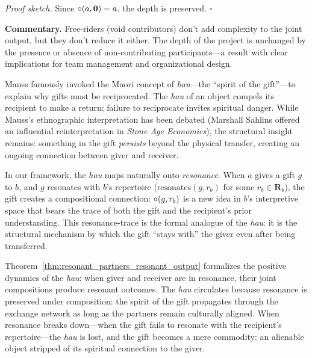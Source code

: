 \noindent\textit{Proof sketch.}\quad
Since $\circ(a, \mathbf{0}) = a$, the depth is preserved.
\hfill$\square$

\medskip

\noindent\textbf{Commentary.}
Free-riders (void contributors) don't add complexity to the joint output,
but they don't reduce it either.  The depth of the project is unchanged
by the presence or absence of non-contributing participants---a result with
clear implications for team management and organizational design.

\begin{remark}
\label{rem:hau-resonance}
Mauss famously invoked the Maori concept of \textit{hau}---the ``spirit
of the gift''---to explain why gifts must be reciprocated.  The
\textit{hau} of an object compels its recipient to make a return; failure
to reciprocate invites spiritual danger.  While Mauss's ethnographic
interpretation has been debated (Marshall Sahlins offered an influential
reinterpretation in \textit{Stone Age Economics}), the structural insight
remains: something in the gift \emph{persists} beyond the physical
transfer, creating an ongoing connection between giver and receiver.

In our framework, the \textit{hau} maps naturally onto \emph{resonance}.
When $a$ gives a gift $g$ to $b$, and $g$ resonates with $b$'s
repertoire ($\text{resonates}(g, r_b)$ for some $r_b \in
\mathbf{R}_b$), the gift creates a compositional connection:
$\circ(g, r_b)$ is a new idea in $b$'s interpretive space that bears
the trace of both the gift and the recipient's prior understanding.
This resonance-trace is the formal analogue of the \textit{hau}: it is
the structural mechanism by which the gift ``stays with'' the giver
even after being transferred.

Theorem~\ref{thm:resonant_partners_resonant_output} formalizes the
positive dynamics of the \textit{hau}: when giver and receiver are in
resonance, their joint compositions produce resonant outcomes.  The
\textit{hau} circulates because resonance is preserved under
composition: the spirit of the gift propagates through the exchange
network as long as the partners remain culturally aligned.  When
resonance breaks down---when the gift fails to resonate with the
recipient's repertoire---the \textit{hau} is lost, and the gift becomes
a mere commodity: an alienable object stripped of its spiritual
connection to the giver.
\end{remark}


